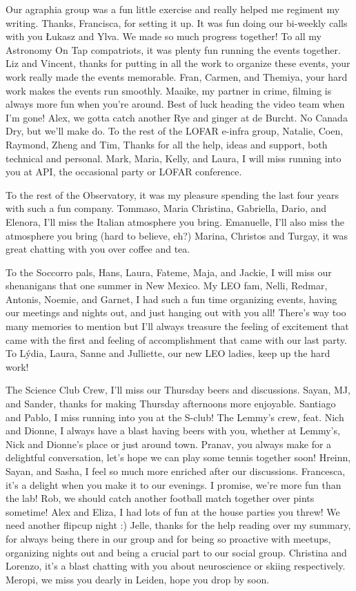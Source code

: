 \begin{thesisacknowledgements}
\begin{changemargin}{-1cm}{-1cm}
{   Our agraphia group was a fun little exercise and really helped me regiment my writing. Thanks, Francisca, for setting it up. It was fun doing our bi-weekly calls with you \L{}ukasz and Ylva. We made so much progress together! To all my Astronomy On Tap compatriots, it was plenty fun running the events together. Liz and Vincent, thanks for putting in all the work to organize these events, your work really made the events memorable. Fran, Carmen,  and Themiya, your hard work makes the events run smoothly. Maaike, my partner in crime, filming is always more fun when you're around. Best of luck heading the video team when I'm gone! Alex, we gotta catch another Rye and ginger at de Burcht. No Canada Dry, but we'll make do. To the rest of the LOFAR e-infra group, Natalie, Coen, Raymond, Zheng and Tim, Thanks for all the help, ideas and support, both technical and personal. Mark, Maria, Kelly, and Laura, I will miss running into you at API, the occasional party or LOFAR conference. 

    To the rest of the Observatory, it was my pleasure spending the last four years with such a fun company. Tommaso, Maria Christina, Gabriella, Dario, and Elenora, I'll miss the Italian atmosphere you bring. Emanuelle, I'll also miss the atmosphere you bring (hard to believe, eh?) Marina, Christos and Turgay, it was great chatting with you over coffee and tea. 

    To the Soccorro pals, Hans, Laura, Fateme, Maja, and Jackie, I will miss our shenanigans that one summer in New Mexico. My LEO fam, Nelli, Redmar, Antonis, Noemie, and Garnet, I had such a fun time organizing events, having our meetings and nights out, and just hanging out with you all! There's way too many memories to mention but I'll always treasure the feeling of excitement that came with the first and feeling of accomplishment that came with our last party. To  L\'ydia, Laura, Sanne and Julliette, our new LEO ladies, keep up the hard work!

    The Science Club Crew, I'll miss our Thursday beers and discussions. Sayan, MJ, and Sander, thanks for making Thursday afternoons more enjoyable. Santiago and Pablo, I miss running into you at the S-club! The Lemmy's crew, feat. Nich and Dionne, I always have a blast having beers with you, whether at Lemmy's, Nick and Dionne's place or just around town. Pranav, you always make for a delightful conversation, let's hope we can play some tennis together soon! Hreinn, Sayan, and Sasha, I feel so much more enriched after our discussions. Francesca, it's a delight when you make it to our evenings. I promise, we're more fun than the lab! Rob, we should catch another football match together over pints sometime! Alex and Eliza, I had lots of fun at the house parties you threw! We need another flipcup night :) Jelle, thanks for the help reading over my summary, for always being there in our group and for being so proactive with meetups, organizing nights out and being a crucial part to our social group. Christina and Lorenzo, it's a blast chatting with you about neuroscience or skiing respectively. Meropi, we miss you dearly in Leiden, hope you drop by soon. 

}
\end{changemargin}
\end{thesisacknowledgements}
